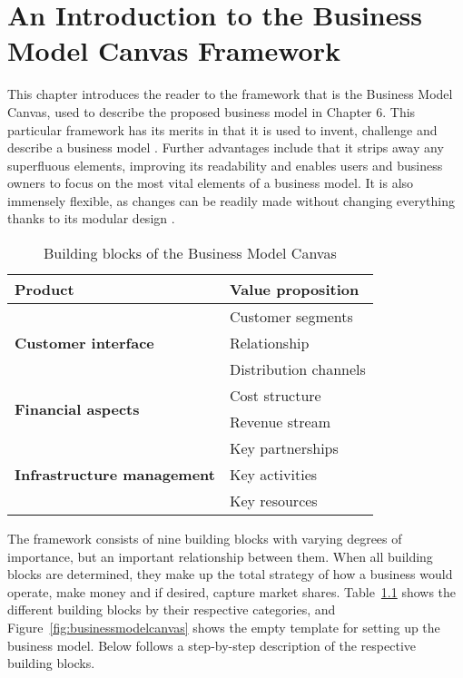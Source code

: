 \chapter{An Introduction to the Business Model Canvas Framework}

This chapter introduces the reader to the framework that is the Business Model Canvas, used to describe the proposed business model in Chapter 6. This particular framework has its merits in that it is used to invent, challenge and describe a business model \cite{strategyzer2016}. Further advantages include that it strips away any superfluous elements, improving its readability and enables users and business owners to focus on the most vital elements of a business model. It is also immensely flexible, as changes can be readily made without changing everything thanks to its modular design \cite{osterwalder2013business}. 


\begin{table}[H]
\centering
\caption{Building blocks of the Business Model Canvas}
\label{tab:canvas}
\begin{tabular}{|l|l|}
\hline
\textbf{Product}                                    & Value proposition     \\ \hline
\multirow{3}{*}{\textbf{Customer interface}}        & Customer segments     \\ \cline{2-2} 
                                                    & Relationship          \\ \cline{2-2} 
                                                    & Distribution channels \\ \hline
\multirow{2}{*}{\textbf{Financial aspects}}         & Cost structure        \\ \cline{2-2} 
                                                    & Revenue stream        \\ \hline
\multirow{3}{*}{\textbf{Infrastructure management}} & Key partnerships      \\ \cline{2-2} 
                                                    & Key activities        \\ \cline{2-2} 
                                                    & Key resources         \\ \hline
\end{tabular}
\end{table}

The framework consists of nine building blocks with varying degrees of importance, but an important relationship between them. When all building blocks are determined, they make up the total strategy of how a business would operate, make money and if desired, capture market shares. Table~\ref{tab:canvas} shows the different building blocks by their respective categories, and Figure~\ref{fig:businessmodelcanvas} shows the empty template for setting up the business model. Below follows a step-by-step description of the respective building blocks.


